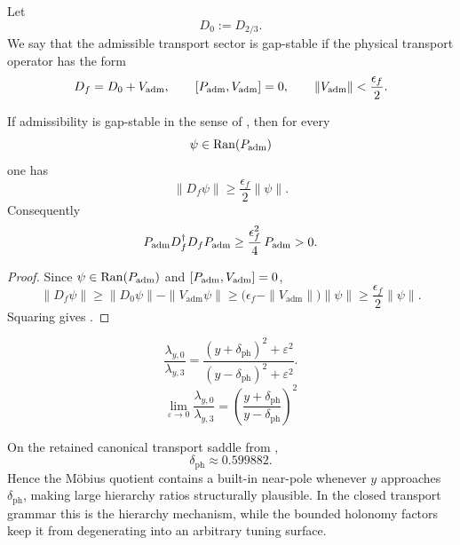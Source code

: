 \begin{definition}
\label{def:gap-stable-admissibility}
Let
\[
D_0:=D_{2/3}.
\]
We say that the admissible transport sector is gap-stable if the physical transport operator has the form
\[
D_f=D_0+V_{\mathrm{adm}},
\qquad
[P_{\mathrm{adm}},V_{\mathrm{adm}}]=0,
\qquad
\|V_{\mathrm{adm}}\|<\frac{\epsilon_f}{2}.
\]
\end{definition}

\begin{proposition}
\label{prop:gap-lift-full-operator}
If admissibility is gap-stable in the sense of , then for every
\[
\psi\in\mathrm{Ran}(P_{\mathrm{adm}})
\]
one has
\[
\|D_f\psi\|
\ge
\frac{\epsilon_f}{2}\|\psi\|.
\]
Consequently
\begin{equation}
\label{eq:gap-lift-full-operator}
P_{\mathrm{adm}} D_f^\dagger D_f P_{\mathrm{adm}}
\ge
\frac{\epsilon_f^2}{4}\,P_{\mathrm{adm}}
>
0.
\end{equation}
\end{proposition}

\begin{proof}
Since $\psi\in\mathrm{Ran}(P_{\mathrm{adm}})$ and $[P_{\mathrm{adm}},V_{\mathrm{adm}}]=0$,
\[
\|D_f\psi\|
\ge
\|D_0\psi\|-\|V_{\mathrm{adm}}\psi\|
\ge
\bigl(\epsilon_f-\|V_{\mathrm{adm}}\|\bigr)\|\psi\|
\ge
\frac{\epsilon_f}{2}\|\psi\|.
\]
Squaring gives .
\end{proof}

\begin{equation}
\label{eq:mobius-quotient}
\frac{\lambda_{y,0}}{\lambda_{y,3}}
=
\frac{(y+\delta_{\mathrm{ph}})^2+\varepsilon^2}{(y-\delta_{\mathrm{ph}})^2+\varepsilon^2}.
\end{equation}
\[
\lim_{\varepsilon\to 0}\frac{\lambda_{y,0}}{\lambda_{y,3}}
=
\left(\frac{y+\delta_{\mathrm{ph}}}{y-\delta_{\mathrm{ph}}}\right)^2
\]
\begin{remark}
On the retained canonical transport saddle from ,
\[
\delta_{\mathrm{ph}}\approx \num{0.599882}.
\]
Hence the Möbius quotient contains a built-in near-pole whenever $y$ approaches $\delta_{\mathrm{ph}}$, making large hierarchy ratios structurally plausible. In the closed transport grammar this is the hierarchy mechanism, while the bounded holonomy factors keep it from degenerating into an arbitrary tuning surface.
\end{remark}

